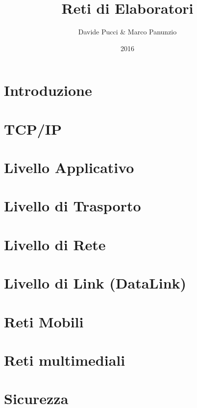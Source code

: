 

\title{Reti di Elaboratori}
\author{Davide Pucci \& Marco Panunzio}
\date{2016}



\maketitle

\tableofcontents

\chapter{Introduzione}


\chapter{TCP/IP}


\chapter{Livello Applicativo}


\chapter{Livello di Trasporto}


\chapter{Livello di Rete}


\chapter{Livello di Link (DataLink)}


\chapter{Reti Mobili}


\chapter{Reti multimediali}


\chapter{Sicurezza}


